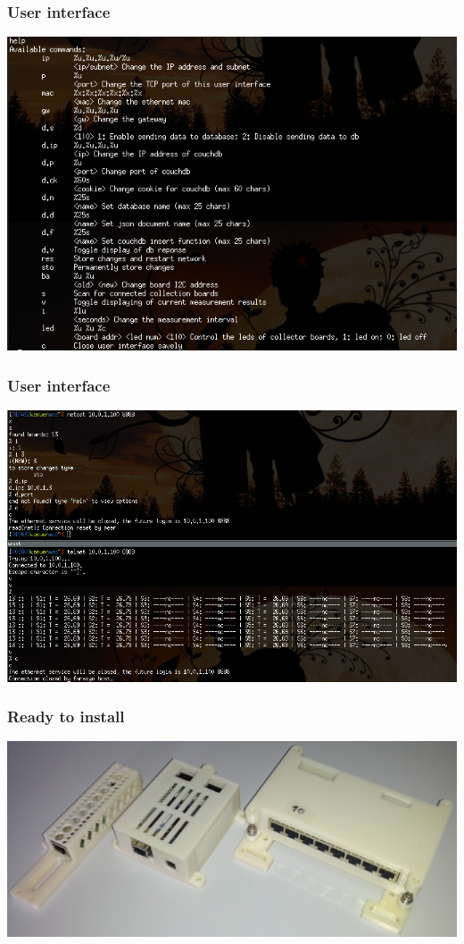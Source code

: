 \documentclass[t]{beamer}
\begin{document}
\begin{frame}[c]
    \frametitle{User interface}
  \begin{center}
  	\includegraphics[width=0.9\linewidth]{img/ui.png}\\
  \vspace{0.5cm}
  \end{center}
\end{frame}
\begin{frame}[c]
    \frametitle{User interface}
  \begin{center}
  	\includegraphics[width=0.9\linewidth]{img/ui2.png}\\
  \vspace{0.5cm}
  \end{center}
\end{frame}
\begin{frame}[c]
    \frametitle{Ready to install}
  \begin{center}
  	\includegraphics[width=0.9\linewidth]{img/pic/cases.jpg}\\
  \vspace{0.5cm}
  \end{center}
\end{frame}
\end{document}
